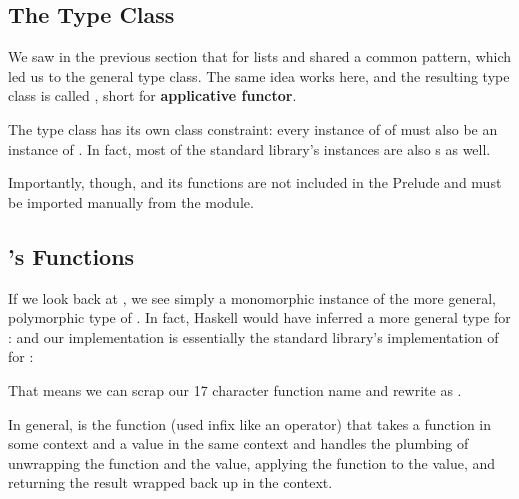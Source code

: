 \subsection{The  Type Class}

We saw in the previous section that  for lists and  shared a common pattern, which led us to the
general  type class. The same idea works here, and the resulting type class is called , short for
\textbf{applicative functor}.



The  type class has its own class constraint: every instance of  of  must also
be an instance of . In fact, most of the standard library's  instances are also s
as well.

Importantly, though,  and its functions are not included in the Prelude and must be imported manually from
the  module.

\subsection{'s Functions}

If we look back at , we see simply
a monomorphic instance of the more general, polymorphic type of \code{(<*>)}. In fact, Haskell would have inferred a more
general type for :  and our implementation is essentially 
the standard library's implementation of \code{(<*>)} for :



That means we can scrap our 17 character function name and rewrite  as 
.

In general, \code{(<*>)} is the function (used infix like an operator) that takes a function in some  context
 and a value in the same context and handles the plumbing of unwrapping the function and the value, applying the function
to the value, and returning the result wrapped back up in the  context.

